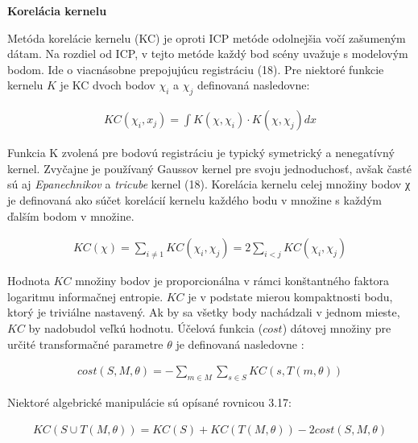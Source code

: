 \textbf{Korelácia kernelu}

Metóda korelácie kernelu (KC) je oproti ICP metóde odolnejšia vočí zašumeným dátam. Na rozdiel od ICP, v tejto metóde každý bod scény uvažuje s modelovým bodom. Ide o viacnásobne prepojujúcu registráciu (18). Pre niektoré funkcie kernelu $K$ je KC dvoch bodov $\chi_i$ a $\chi_j$ definovaná nasledovne:

\begin{equation}
\label{eq14}
\begin{aligned}
KC\left(\chi_i,x_j\right)=\int K\left(\chi,\chi_i\right) \cdot K\left(\chi,\chi_j\right) dx 
\end{aligned}
\end{equation}

Funkcia K zvolená pre bodovú registráciu je typický symetrický a nenegatívný kernel. Zvyčajne je používaný Gaussov kernel pre svoju jednoduchosť, avšak časté sú aj \textit{Epanechnikov} a \textit{tricube} kernel (18). Korelácia kernelu celej množiny bodov χ je definovaná ako súčet korelácií kernelu každého bodu v množine s každým ďalším bodom v množine.


\begin{equation}
\label{eq15}
\begin{aligned}
KC\left(\chi\right) = \sum_{i\ne1} KC\left(\chi_i,\chi_j\right)=2\sum_{i<j} KC\left(\chi_i,\chi_j\right)
\end{aligned}
\end{equation}

Hodnota $KC$ množiny bodov je proporcionálna v rámci konštantného faktora logaritmu informačnej entropie. $KC$ je v podstate mierou kompaktnosti bodu, ktorý je triviálne nastavený. Ak by sa všetky body nachádzali v jednom mieste, $KC$ by nadobudol veľkú hodnotu. Účelová funkcia ($cost$) dátovej množiny pre určité transformačné parametre $\theta$ je definovaná nasledovne :

\begin{equation}
\label{eq16}
\begin{aligned}
cost\left(S,M,\theta\right)= - \sum_{m\in M} \sum_{s\in S} KC \left(s, T\left(m, \theta \right)\right)
\end{aligned}
\end{equation}

Niektoré algebrické manipulácie sú opísané rovnicou 3.17:

\begin{equation}
\label{eq17}
\begin{aligned}
KC\left(S\cup T\left(M,\theta\right)\right) = KC\left(S\right) + KC\left(T \left(M, \theta \right)\right) - 2cost\left(S,M,\theta \right)
\end{aligned}
\end{equation}

